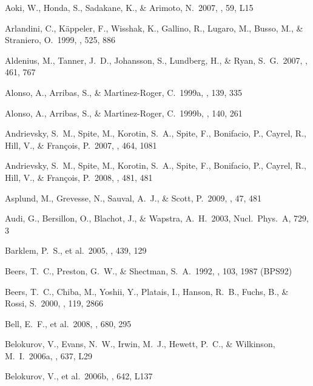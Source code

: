 \documentclass{emulateapj}
\begin{document}
\begin{thebibliography}{}

 Aoki, W., Honda, S., 
Sadakane, K., \& Arimoto, N.\ 2007, \pasj, 59, L15 

 Arlandini, C., 
K{\"a}ppeler, F., Wisshak, K., Gallino, R., Lugaro, M., Busso, M., 
\& Straniero, O.\ 1999, \apj, 525, 886 

 Aldenius, M., Tanner, J.~D., 
Johansson, S., Lundberg, H., \& Ryan, S.~G.\ 2007, \aap, 461, 767 

 Alonso, A., Arribas, S., \& 
Mart{\'{\i}}nez-Roger, C.\ 1999a, \aaps, 139, 335 

 Alonso, A., Arribas, S., \& 
Mart{\'{\i}}nez-Roger, C.\ 1999b, \aaps, 140, 261 

 Andrievsky, S.~M., 
Spite, M., Korotin, S.~A., Spite, F., Bonifacio, P., Cayrel, R., 
Hill, V., \& Fran{\c c}ois, P.\ 2007, \aap, 464, 1081 

 Andrievsky, S.~M., 
Spite, M., Korotin, S.~A., Spite, F., Bonifacio, P., Cayrel, R., 
Hill, V., \& Fran{\c c}ois, P.\ 2008, \aap, 481, 481 

 Asplund, M., Grevesse, 
N., Sauval, A.~J., \& Scott, P.\ 2009, \araa, 47, 481

 Audi, G., Bersillon, O., Blachot, J., 
\& Wapstra, A.~H.\ 2003, Nucl.\ Phys.\ A, 729, 3

 Barklem, P.~S., et al.\ 2005, 
\aap, 439, 129 

 Beers, T.~C., Preston, 
G.~W., \& Shectman, S.~A.\ 1992, \aj, 103, 1987 (BPS92)

 Beers, T.~C., Chiba, M., 
Yoshii, Y., Platais, I., Hanson, R.~B., Fuchs, B., 
\& Rossi, S.\ 2000, \aj, 119, 2866 

 Bell, E.~F., et al.\ 2008, 
\apj, 680, 295 

 Belokurov, V., Evans, 
N.~W., Irwin, M.~J., Hewett, P.~C., 
\& Wilkinson, M.~I.\ 2006a, \apjl, 637, L29  %

 Belokurov, V., et 
al.\ 2006b, \apjl, 642, L137 %


\end{thebibliography}
\end{document}
